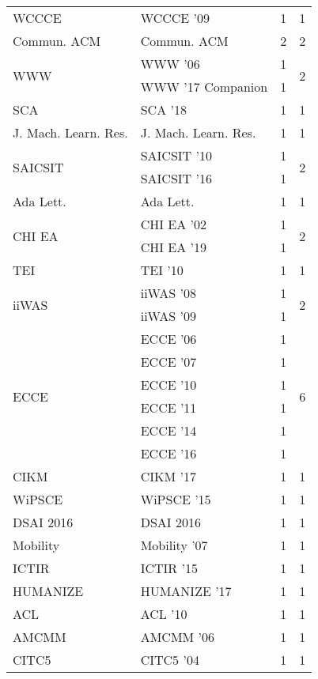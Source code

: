 \begin{table*}[t]
\begin{tabular}{llrr}
\multirow{1}{*}{WCCCE } & WCCCE '09 & 1 & \multirow{1}{*}{1}\\
\multirow{1}{*}{Commun. ACM} & Commun. ACM & 2 & \multirow{1}{*}{2}\\
\multirow{2}{*}{WWW } & WWW '06 & 1 & \multirow{2}{*}{2}\\
& WWW '17 Companion & 1 &\\
\multirow{1}{*}{SCA } & SCA '18 & 1 & \multirow{1}{*}{1}\\
\multirow{1}{*}{J. Mach. Learn. Res.} & J. Mach. Learn. Res. & 1 & \multirow{1}{*}{1}\\
\multirow{2}{*}{SAICSIT } & SAICSIT '10 & 1 & \multirow{2}{*}{2}\\
& SAICSIT '16 & 1 &\\
\multirow{1}{*}{Ada Lett.} & Ada Lett. & 1 & \multirow{1}{*}{1}\\
\multirow{2}{*}{CHI EA } & CHI EA '02 & 1 & \multirow{2}{*}{2}\\
& CHI EA '19 & 1 &\\
\multirow{1}{*}{TEI } & TEI '10 & 1 & \multirow{1}{*}{1}\\
\multirow{2}{*}{iiWAS } & iiWAS '08 & 1 & \multirow{2}{*}{2}\\
& iiWAS '09 & 1 &\\
\multirow{6}{*}{ECCE } & ECCE '06 & 1 & \multirow{6}{*}{6}\\
& ECCE '07 & 1 &\\
& ECCE '10 & 1 &\\
& ECCE '11 & 1 &\\
& ECCE '14 & 1 &\\
& ECCE '16 & 1 &\\
\multirow{1}{*}{CIKM } & CIKM '17 & 1 & \multirow{1}{*}{1}\\
\multirow{1}{*}{WiPSCE } & WiPSCE '15 & 1 & \multirow{1}{*}{1}\\
\multirow{1}{*}{DSAI 2016} & DSAI 2016 & 1 & \multirow{1}{*}{1}\\
\multirow{1}{*}{Mobility } & Mobility '07 & 1 & \multirow{1}{*}{1}\\
\multirow{1}{*}{ICTIR } & ICTIR '15 & 1 & \multirow{1}{*}{1}\\
\multirow{1}{*}{HUMANIZE } & HUMANIZE '17 & 1 & \multirow{1}{*}{1}\\
\multirow{1}{*}{ACL } & ACL '10 & 1 & \multirow{1}{*}{1}\\
\multirow{1}{*}{AMCMM } & AMCMM '06 & 1 & \multirow{1}{*}{1}\\
\multirow{1}{*}{CITC5 } & CITC5 '04 & 1 & \multirow{1}{*}{1}\\

\end{tabular}
\end{table*}
